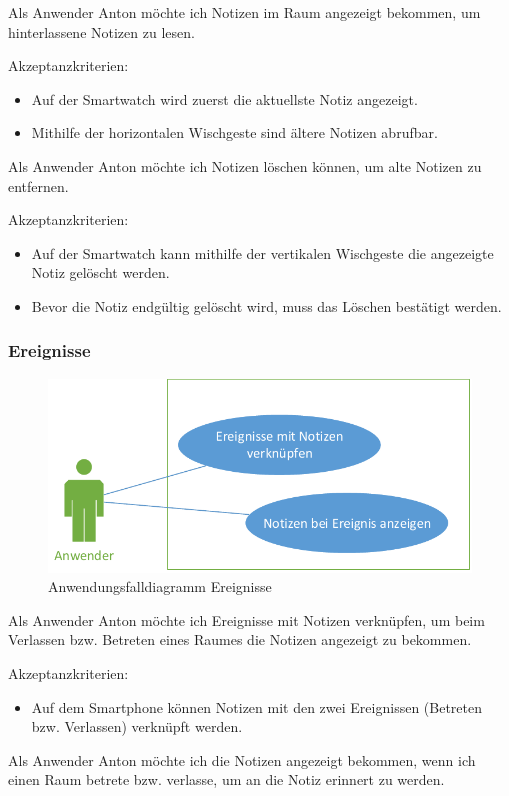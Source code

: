Als Anwender Anton möchte ich Notizen im Raum angezeigt bekommen, um hinterlassene Notizen zu lesen.

Akzeptanzkriterien:
\begin{itemize}
\item Auf der Smartwatch wird zuerst die aktuellste Notiz angezeigt.
\item Mithilfe der horizontalen Wischgeste sind ältere Notizen abrufbar.
\end{itemize}

Als Anwender Anton möchte ich Notizen löschen können, um alte Notizen zu entfernen.

Akzeptanzkriterien:
\begin{itemize}
\item Auf der Smartwatch kann mithilfe der vertikalen Wischgeste die angezeigte Notiz gelöscht werden.
\item Bevor die Notiz endgültig gelöscht wird, muss das Löschen bestätigt werden.
\end{itemize}

\subsubsection{Ereignisse}
\begin{figure}[H]
\centering
\includegraphics[width=0.7\linewidth]{Bilder/UseCase-Ereignisse}
\caption{Anwendungsfalldiagramm Ereignisse}
\label{fig:UseCase-Ereignisse}
\end{figure}

Als Anwender Anton möchte ich Ereignisse mit Notizen verknüpfen, um beim Verlassen bzw. Betreten eines Raumes die Notizen angezeigt zu bekommen.

Akzeptanzkriterien:
\begin{itemize}
\item Auf dem Smartphone können Notizen mit den zwei Ereignissen (Betreten bzw. Verlassen) verknüpft werden.
\end{itemize}

\newpage
Als Anwender Anton möchte ich die Notizen angezeigt bekommen, wenn ich einen Raum betrete bzw. verlasse, um an die Notiz erinnert zu werden.

